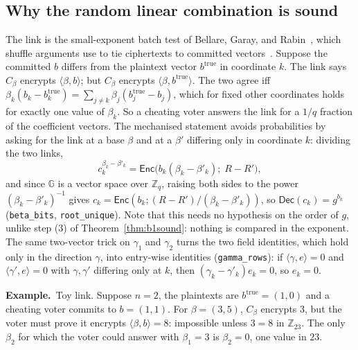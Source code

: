 \documentclass[11pt,a4paper]{article}
\newcommand{\G}{\mathbb{G}}
\newcommand{\Z}{\mathbb{Z}}
\newcommand{\Enc}{\mathsf{Enc}}
\newcommand{\Dec}{\mathsf{Dec}}
\newcommand{\rocq}[1]{\texttt{#1}}
\newcommand{\ex}[1]{\par\medskip\noindent\textbf{Example.}~#1\par\medskip}
\theoremstyle{remark}
\begin{document}
\subsection{Why the random linear combination is sound}
The link is the small-exponent batch test of Bellare, Garay, and
Rabin~\cite{bgr98}, which shuffle arguments use to tie ciphertexts to
committed vectors~\cite{tereliuswikstrom,bayergroth}.
Suppose the committed $b$ differs from the plaintext vector
$b^{\mathrm{true}}$ in coordinate $k$. The link says $C_\beta$ encrypts
$\langle \beta, b \rangle$; but $C_\beta$ encrypts $\langle \beta,
b^{\mathrm{true}} \rangle$. The two agree iff $\beta_k (b_k -
b^{\mathrm{true}}_k) = \sum_{j \ne k} \beta_j (b^{\mathrm{true}}_j - b_j)$,
which for fixed other coordinates holds for exactly one value of
$\beta_k$. So a cheating voter answers the link for a $1/q$ fraction of
the coefficient vectors. The mechanised statement avoids probabilities by
asking for the link at a base $\beta$ and at a $\beta'$ differing only in
coordinate $k$: dividing the two links,
\[
  c_k^{\beta_k - \beta'_k} = \Enc\big(b_k (\beta_k - \beta'_k);\; R - R'\big),
\]
and since $\G$ is a vector space over $\Z_q$, raising both sides to the
power $(\beta_k - \beta'_k)^{-1}$ gives $c_k = \Enc(b_k; (R - R')/(\beta_k
- \beta'_k))$, so $\Dec(c_k) = g^{b_k}$ (\rocq{beta\_bits},
\rocq{root\_unique}). Note that this needs no hypothesis on the order of
$g$, unlike step (3) of Theorem~\ref{thm:b1sound}: nothing is compared in
the exponent. The same two-vector trick on $\gamma_1$ and $\gamma_2$ turns
the two field identities, which hold only in the direction $\gamma$, into
entry-wise identities (\rocq{gamma\_rows}): if $\langle \gamma, e \rangle
= 0$ and $\langle \gamma', e \rangle = 0$ with $\gamma, \gamma'$ differing
only at $k$, then $(\gamma_k - \gamma'_k) e_k = 0$, so $e_k = 0$.

\ex{Toy link. Suppose $n = 2$, the plaintexts are $b^{\mathrm{true}} = (1,
0)$ and a cheating voter commits to $b = (1, 1)$. For $\beta = (3, 5)$,
$C_\beta$ encrypts $3$, but the voter must prove it encrypts $\langle
\beta, b \rangle = 8$: impossible unless $3 = 8$ in $\Z_{23}$. The only
$\beta_2$ for which the voter could answer with $\beta_1 = 3$ is $\beta_2 =
0$, one value in $23$.}
\end{document}
